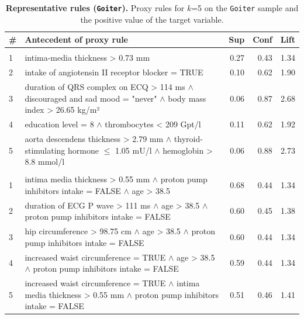 \documentclass[
  oneside]{book}
\begin{document}
\begin{table}

\caption{\label{tab:04-findings-goiter}\textbf{Representative rules (\texttt{Goiter}).} Proxy rules for \(k\)=5 on the \texttt{Goiter} sample and the positive value of the target variable.}
\centering
\begin{tabular}[t]{l>{\raggedright\arraybackslash}p{10cm}rrr}
\toprule
\textbf{\#} & \textbf{Antecedent of proxy rule} & \textbf{Sup} & \textbf{Conf} & \textbf{Lift}\\
\midrule
\addlinespace[0.3em]
\multicolumn{5}{l}{\textbf{HotSpot}}\\
\hspace{1em}1 & intima-media thickness > 0.73 mm & 0.27 & 0.43 & 1.34\\
\hspace{1em}2 & intake of angiotensin II receptor blocker = TRUE & 0.10 & 0.62 & 1.90\\
\hspace{1em}3 & duration of QRS complex on ECQ > 114 ms $\wedge$ discouraged and sad mood = "never" $\wedge$ body mass index > 26.65 kg/m² & 0.06 & 0.87 & 2.68\\
\hspace{1em}4 & education level = 8 $\wedge$ thrombocytes < 209 Gpt/l & 0.11 & 0.62 & 1.92\\
\hspace{1em}5 & aorta descendens thickness > 2.79 mm $\wedge$ thyroid-stimulating hormone $\leq$ 1.05 mU/l $\wedge$ hemoglobin > 8.8 mmol/l & 0.06 & 0.88 & 2.73\\
\addlinespace[0.3em]
\multicolumn{5}{l}{\textbf{SD-Map}}\\
\hspace{1em}1 & intima media thickness > 0.55 mm $\wedge$ proton pump inhibitors intake = FALSE $\wedge$ age > 38.5 & 0.68 & 0.44 & 1.34\\
\hspace{1em}2 & duration of ECG P wave > 111 ms $\wedge$ age > 38.5 $\wedge$ proton pump inhibitors intake = FALSE & 0.60 & 0.45 & 1.38\\
\hspace{1em}3 & hip circumference > 98.75 cm $\wedge$ age > 38.5 $\wedge$ proton pump inhibitors intake = FALSE & 0.60 & 0.44 & 1.34\\
\hspace{1em}4 & increased waist circumference = TRUE $\wedge$ age > 38.5 $\wedge$ proton pump inhibitors intake = FALSE & 0.59 & 0.44 & 1.34\\
\hspace{1em}5 & increased waist circumference = TRUE $\wedge$ intima media thickness > 0.55 mm $\wedge$ proton pump inhibitors intake = FALSE & 0.51 & 0.46 & 1.41\\
\bottomrule
\end{tabular}
\end{table}
\end{document}
